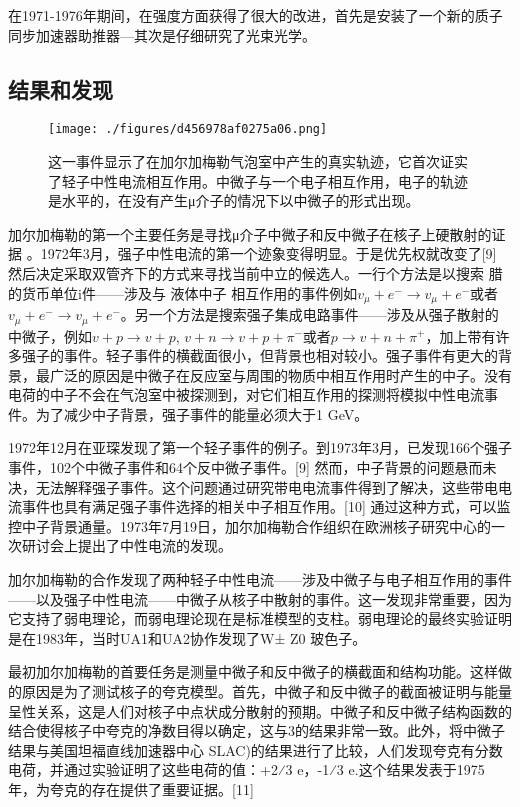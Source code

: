 在1971-1976年期间，在强度方面获得了很大的改进，首先是安装了一个新的质子同步加速器助推器—其次是仔细研究了光束光学。

\subsection{结果和发现}
\begin{figure}[ht]
\centering
\texttt{[image: ./figures/d456978af0275a06.png]}
\caption{这一事件显示了在加尔加梅勒气泡室中产生的真实轨迹，它首次证实了轻子中性电流相互作用。中微子与一个电子相互作用，电子的轨迹是水平的，在没有产生μ介子的情况下以中微子的形式出现。} \label{fig_JRJML_6}
\end{figure}
加尔加梅勒的第一个主要任务是寻找μ介子中微子和反中微子在核子上硬散射的证据 。1972年3月，强子中性电流的第一个迹象变得明显。于是优先权就改变了[9] 然后决定采取双管齐下的方式来寻找当前中立的候选人。一行个方法是以搜索 腊的货币单位i件——涉及与 液体中子 相互作用的事件例如$v_\mu+e^-\to v_\mu+e^-$或者$v_\mu+e^-\to v_\mu+e^-$。另一个方法是搜索强子集成电路事件——涉及从强子散射的中微子，例如$v + p \to v + p$, $v + n \to v + p + \pi^-$或者$p \to v + n + \pi^+$，加上带有许多强子的事件。轻子事件的横截面很小，但背景也相对较小。强子事件有更大的背景，最广泛的原因是中微子在反应室与周围的物质中相互作用时产生的中子。没有电荷的中子不会在气泡室中被探测到，对它们相互作用的探测将模拟中性电流事件。为了减少中子背景，强子事件的能量必须大于1 GeV。

1972年12月在亚琛发现了第一个轻子事件的例子。到1973年3月，已发现166个强子事件，102个中微子事件和64个反中微子事件。[9] 然而，中子背景的问题悬而未决，无法解释强子事件。这个问题通过研究带电电流事件得到了解决，这些带电电流事件也具有满足强子事件选择的相关中子相互作用。[10] 通过这种方式，可以监控中子背景通量。1973年7月19日，加尔加梅勒合作组织在欧洲核子研究中心的一次研讨会上提出了中性电流的发现。

加尔加梅勒的合作发现了两种轻子中性电流——涉及中微子与电子相互作用的事件——以及强子中性电流——中微子从核子中散射的事件。这一发现非常重要，因为它支持了弱电理论，而弱电理论现在是标准模型的支柱。弱电理论的最终实验证明是在1983年，当时UA1和UA2协作发现了W± Z0 玻色子。

最初加尔加梅勒的首要任务是测量中微子和反中微子的横截面和结构功能。这样做的原因是为了测试核子的夸克模型。首先，中微子和反中微子的截面被证明与能量呈性关系，这是人们对核子中点状成分散射的预期。中微子和反中微子结构函数的结合使得核子中夸克的净数目得以确定，这与3的结果非常一致。此外，将中微子结果与美国坦福直线加速器中心 SLAC)的结果进行了比较，人们发现夸克有分数电荷，并通过实验证明了这些电荷的值：+2⁄3 e，-1⁄3 e.这个结果发表于1975年，为夸克的存在提供了重要证据。[11]

